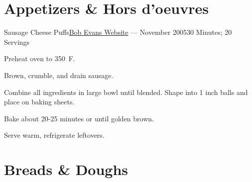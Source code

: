 \documentclass{article}
\begin{document}
\renewcommand*{\recipetitlefont}{\large\bfseries}

\tableofcontents

\section{Appetizers \& Hors d'oeuvres}

\begin{recipe}{Sausage Cheese Puffs}{\href{http://www.bobevans.com/Recipe/17/Sausage-Cheese-Puffs}{Bob Evans Website} --- November 2005}{30 Minutes; 20 Servings}

   \newstep
   Preheat oven to 350\ \0F. 

   Brown, crumble, and drain sausage.

   Combine all ingredients in large bowl until blended.  Shape into 1 inch balls and place on baking sheets.

   \newstep
   Bake about 20-25 minutes or until golden brown.

   \freeform
   Serve warm, refrigerate leftovers.

\end{recipe}

\section{Breads \& Doughs}
\end{document}
